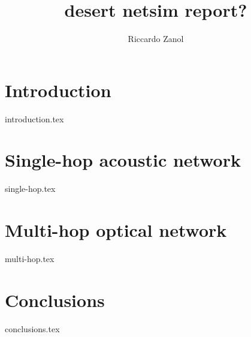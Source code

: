 \documentclass[a4paper,twoside,twocolumn]{article}
\author{Riccardo Zanol}
\title{desert netsim report?}
\begin{document}
\maketitle

\section{Introduction}
{introduction.tex}
\section{Single-hop acoustic network}
{single-hop.tex}
\section{Multi-hop optical network}
{multi-hop.tex}
\section{Conclusions}
{conclusions.tex}

\printbibliography
\end{document}
